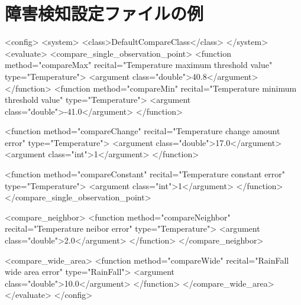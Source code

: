\section{障害検知設定ファイルの例}
\begin{verbatimtab}
<config>
<system>
<class>DefaultCompareClass</class>
</system>
<evaluate>
<compare_single_observation_point>
<function method="compareMax" recital="Temperature maximum threshold value"
type="Temperature"> <argument class="double">40.8</argument>
</function>
<function method="compareMin" recital="Temperature minimum threshold value"
type="Temperature"> <argument class="double">-41.0</argument>
</function>

<function method="compareChange" recital="Temperature change amount error"
type="Temperature"> <argument class="double">17.0</argument>
<argument class="int">1</argument>
</function>

<function method="compareConstant" recital="Temperature constant error"
type="Temperature"> <argument class="int">1</argument>
</function>
</compare_single_observation_point>

<compare_neighbor>
<function method="compareNeighbor" recital="Temperature neibor error"
type="Temperature"> <argument class="double">2.0</argument>
</function>
</compare_neighbor>

<compare_wide_area>
<function method="compareWide" recital="RainFall wide area error"
type="RainFall"> <argument class="double">10.0</argument>
</function>
</compare_wide_area>
</evaluate>
</config>
\end{verbatimtab}

